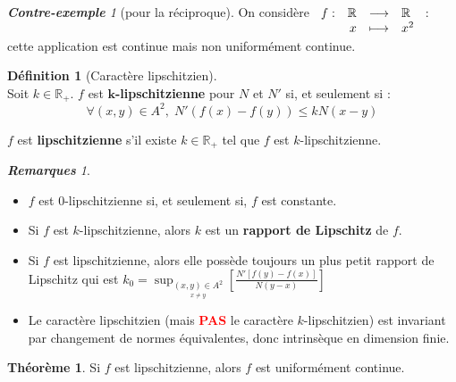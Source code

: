 \documentclass[12pt]{book}
\let\ensembleNombre\mathbb
\newcommand*\R{\ensuremath{\ensembleNombre{R}}}
\newcommand{\app}[5]{\ensuremath{
\begin{array}[t]{lrcl}
#1 : & #2 & \longrightarrow & #3 \\
    & #4 & \longmapsto & #5 \end{array}
}}
\theoremstyle{definition}
\newtheorem*{defi}{Définition}
\newtheorem{thme}{Théorème}[chapter]
\theoremstyle{remark}
\newtheorem*{rems}{\textbf{Remarques}}
\newtheorem*{cex}{\textbf{Contre-exemple}}
\newenvironment{fdef}
  {\begin{mdframed}[roundcorner=10pt, linewidth=1pt]\begin{defi}}
  {\end{defi}\end{mdframed}}
\newenvironment{fthme}
  {\begin{mdframed}[roundcorner=10pt, linewidth=2pt]\begin{thme}}
  {\end{thme}\end{mdframed}}
\begin{document}
	\begin{cex}[pour la réciproque]
	On considère $\app{f}{\R}{\R}{x}{x^2}$ : cette application est continue mais non uniformément continue.
	\end{cex}
	
	\begin{fdef}[Caractère lipschitzien]\mbox{~}\\
	Soit $k \in \R_+$. $f$ est \textbf{$\bm{k}$-lipschitzienne} pour $N$ et $N'$ si, et seulement si : 
	\[ \forall (x,y) \in A^2, \; N'(f(x) - f(y)) \leq k N(x-y) \]
	
	\noindent $f$ est \textbf{lipschitzienne} s'il existe $k \in \R_+$ tel que $f$ est $k$-lipschitzienne.
	\end{fdef}
	
	\begin{rems}\mbox{~}\\
	\begin{itemize}
	\item[1)] $f$ est 0-lipschitzienne si, et seulement si, $f$ est constante.
	\item[2)] Si $f$ est $k$-lipschitzienne, alors $k$ est un \textbf{rapport de Lipschitz} de $f$.
	\item[3)] Si $f$ est lipschitzienne, alors elle possède toujours un plus petit rapport de Lipschitz qui est $k_0 = \sup_{\underset{x \neq y}{(x,y) \in A^2}} \left[ \frac{N'[f(y) - f(x)]}{N(y-x)} \right]$
	\item[4)] Le caractère lipschitzien (mais \textbf{\textcolor{red}{PAS}} le caractère $k$-lipschitzien) est invariant par changement de normes équivalentes, donc intrinsèque en dimension finie.
	\end{itemize}
	\end{rems}
	
	\begin{fthme}
	Si $f$ est lipschitzienne, alors $f$ est uniformément continue.
	\end{fthme}
	
\end{document}
